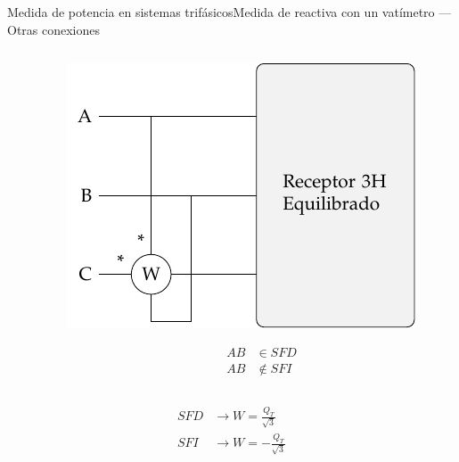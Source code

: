 \documentclass[aspectratio=169, xcolor={usenames,svgnames,dvipsnames}]{beamer}
\begin{document}
\begin{frame}{Medida de potencia en sistemas trifásicos}{Medida de reactiva con un vatímetro --- Otras conexiones}
\begin{columns}
\begin{column}{0.33\columnwidth}
\end{column}
\begin{column}{0.33\columnwidth}
\begin{center}
\includegraphics[height=0.25\textheight]{../figs/Reactiva3H_C-AB.pdf}
\end{center}
\begin{align*}
  AB &\in SFD\\
  AB &\notin SFI
\end{align*}
\end{column}
\end{columns}
\begin{align*}
SFD &\rightarrow \boxed{W = \frac{Q_T}{\sqrt{3}}}\\
SFI &\rightarrow \boxed{W =  - \frac{Q_T}{\sqrt{3}}}
\end{align*}
\end{frame}
\end{document}
